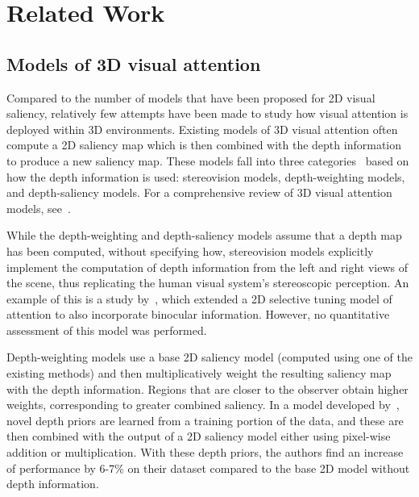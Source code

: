 \section{Related Work}
\subsection{Models of 3D visual attention}
Compared to the number of models that have been proposed for 2D visual
saliency, relatively few attempts have been made to study how visual
attention is deployed within 3D environments. Existing models of 3D
visual attention often compute a 2D saliency map which is then combined
with the depth information to produce a new saliency map. These models
fall into three categories~\citep{Wang_etal13} based on how the depth
information is used: stereovision models, depth-weighting models, and depth-saliency models. For a comprehensive review of 3D visual attention models, see~\cite{Wang_etal13,Ma_Hang15}.

While the depth-weighting and depth-saliency models assume that a depth map has been computed, without specifying how, stereovision models explicitly implement the computation of depth information from
the left and right views of the scene, thus replicating the human visual system's stereoscopic perception.  An example of this is a
study by~\cite{Bruce_Tsotsos05}, which extended a 2D selective tuning
model of attention to also incorporate binocular information. However,
no quantitative assessment of this model was performed.

Depth-weighting models use a base 2D saliency model (computed using one of the existing methods) and then multiplicatively weight the
resulting saliency map with the depth information. Regions that are
closer to the observer obtain higher weights, corresponding to greater
combined saliency. In a model developed by~\cite{Lang_etal12}, novel
depth priors are learned from a training portion of the data, and these are then combined with the output of a 2D saliency model either
using pixel-wise addition or multiplication. With these depth priors,
the authors find an increase of performance by 6-7\% on their dataset
compared to the base 2D model without depth information.


